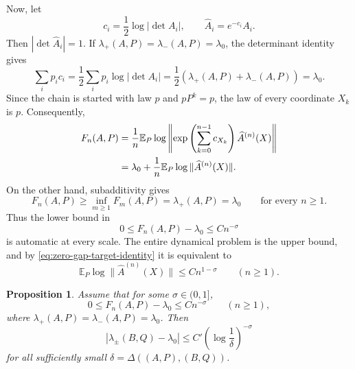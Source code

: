 \documentclass[11pt,a4paper]{amsart}
\newtheorem{proposition}[theorem]{Proposition}
\theoremstyle{definition}
\theoremstyle{remark}
\numberwithin{equation}{section}
\newcommand{\EE}{\mathbb E}
\newcommand{\1}{\boldsymbol 1}
\begin{document}
Now, let 
\begin{equation}\label{eq:normalization}
 c_i=\frac12\log|\det A_i|,
 \qquad \widehat A_i=e^{-c_i}A_i.
\end{equation}
Then $|\det\widehat A_i|=1$.  If
$\lambda_+(A,P)=\lambda_-(A,P)=\lambda_0$, the determinant identity
gives
\begin{equation}\label{eq:zero-gap-scalar-mean}
 \sum_i p_i c_i
 =\frac12\sum_i p_i\log|\det A_i|
 =\frac12(\lambda_+(A,P)+\lambda_-(A,P))
 =\lambda_0.
\end{equation}
Since the chain is started with law $p$ and $pP^k=p$, the law of
every coordinate $X_k$ is $p$.  Consequently,
\begin{align}
 F_n(A,P)
 &=\frac1n\EE_P\log\left\|
     \exp\left(\sum_{k=0}^{n-1}c_{X_k}\right)
     \widehat A^{(n)}(X)\right\|\notag\\
 &=\lambda_0+
   \frac1n\EE_P\log\|\widehat A^{(n)}(X)\|.
 \label{eq:zero-gap-target-identity}
\end{align}
On the other hand, subadditivity gives
\begin{equation}\label{eq:zero-gap-lower-all-scales}
 F_n(A,P)\ge\inf_{m\ge1}F_m(A,P)
 =\lambda_+(A,P)=\lambda_0
 \qquad\text{for every }n\ge1.
\end{equation}
Thus the lower bound in
$$
 0\le F_n(A,P)-\lambda_0\le Cn^{-\sigma}
$$
is automatic at every scale.  The entire dynamical problem is the
upper bound, and by \eqref{eq:zero-gap-target-identity} it is equivalent
to
\begin{equation}\label{eq:normalized-growth-target}
 \EE_P\log\|\widehat A^{(n)}(X)\|
 \le Cn^{1-\sigma}
 \qquad(n\ge1).
\end{equation}

\begin{proposition}%
\label{prop:finite-time-principle}
Assume that for some $\sigma\in(0,1]$,
\begin{equation}\label{eq:finite-time-rate}
 0\le F_n(A,P)-\lambda_0\le Cn^{-\sigma}
 \qquad(n\ge1),
\end{equation}
where $\lambda_+(A,P)=\lambda_-(A,P)=\lambda_0$.  Then
\begin{equation}\label{eq:abstract-logholder}
 |\lambda_\pm(B,Q)-\lambda_0|
 \le C'\left(\log\frac1\delta\right)^{-\sigma}
\end{equation}
for all sufficiently small $\delta=\Delta((A,P),(B,Q))$.
\end{proposition}
\end{document}
